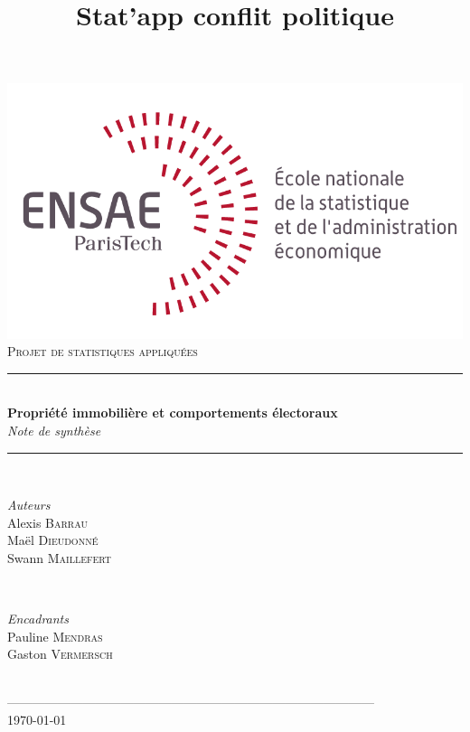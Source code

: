 \documentclass[12pt]{article}
\title{Stat'app conflit politique}
\begin{document}
\begin{titlepage}

\newcommand{\HRule}{\rule{\linewidth}{0.5mm}} %

\center

\includegraphics[scale=1.2]{ensae_logo_dev.png}\\[1cm]
\textsc{\Large Projet de statistiques appliquées}\\[0.5cm]

\HRule \\[0.4cm]
{ \huge \bfseries Propriété immobilière et comportements électoraux}\\[0.4cm]
\emph{\Large Note de synthèse}\\[0.1cm]
\HRule \\[0.6cm]

\begin{minipage}{0.4\textwidth}
\begin{flushleft} \large
\emph{Auteurs}\\
Alexis \textsc{Barrau}\\
Maël \textsc{Dieudonné}\\
Swann \textsc{Maillefert}\\
\end{flushleft}
\end{minipage}\\[1cm]

\begin{minipage}{0.4\textwidth}
\begin{flushleft} \large
\emph{Encadrants}\\
Pauline \textsc{Mendras}\\
Gaston \textsc{Vermersch}\\
\end{flushleft}
\end{minipage}\\[1cm]

 ---------------------------------------------------------------------------------------\\[0.2cm]

{\large \today}\\[2cm]
\vfill

\end{titlepage}
\end{document}
